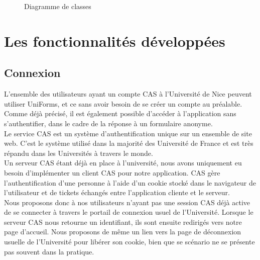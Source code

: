 \documentclass{sigplanconf}
\begin{document}
\begin{figure}
\begin{center}
\end{center}
\caption{Diagramme de classes}\label{diagrammeClasses}
\end{figure}

\section{Les fonctionnalités développées}
\subsection{Connexion}%
L’ensemble des utilisateurs ayant un compte CAS à l’Université de Nice peuvent utiliser UniForms, et ce sans avoir besoin de se créer un compte au préalable. Comme déjà précisé, il est également possible d’accéder à l’application sans s’authentifier, dans le cadre de la réponse à un formulaire anonyme.\\

Le service CAS est un système d’authentification unique sur un ensemble de site web. C’est le système utilisé dans la majorité des Université de France et est très répandu dans les Universités à travers le monde.\\
Un serveur CAS étant déjà en place à l’université, nous avons uniquement eu besoin d’implémenter un client CAS pour notre application. CAS gère l’authentification d’une personne à l’aide d’un cookie stocké dans le navigateur de l’utilisateur et de tickets échangés entre l’application cliente et le serveur.\\
Nous proposons donc à nos utilisateurs n’ayant pas une session CAS déjà active de se connecter à travers le portail de connexion usuel de l’Université. Lorsque le serveur CAS nous retourne un identifiant, ils sont ensuite redirigés vers notre page d’accueil. Nous proposons de même un lien vers la page de déconnexion usuelle de l’Université pour libérer son cookie, bien que se scénario ne se présente pas souvent dans la pratique.
\end{document}

